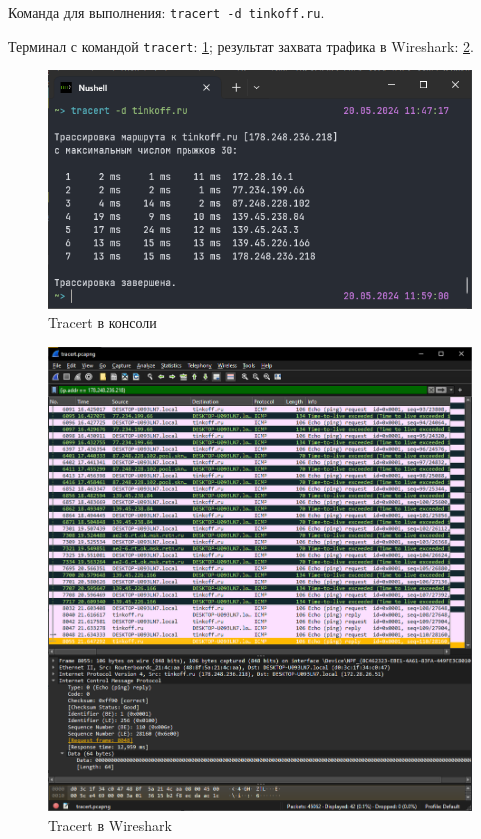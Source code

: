 
Команда для выполнения: \verb|tracert -d tinkoff.ru|\;.

Терминал с командой \verb|tracert|: \ref{fig:tracert-shell}; результат захвата трафика в Wireshark: \ref{fig:tracert-wireshark}.

\begin{figure}[h]
    \centering
    \includegraphics[width=1\linewidth]{res/tracert-shell.png}
    \caption{Tracert в консоли}
    \label{fig:tracert-shell}
\end{figure}

\begin{figure}
    \centering
    \includegraphics[width=1\linewidth]{res/tracert-wireshark.png}
    \caption{Tracert в Wireshark}
    \label{fig:tracert-wireshark}
\end{figure}

